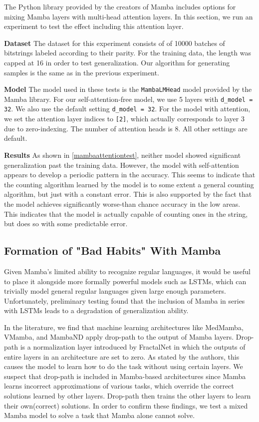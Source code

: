 The Python library provided by the creators of Mamba\cite{mamba} includes
options for mixing Mamba layers with multi-head attention layers.
In this section, we run an experiment to test the effect including this
attention layer.

\textbf{Dataset}
The dataset for this experiment consists of of 10000 batches of bitstrings
labeled according to their parity.
For the training data, the length was capped at 16 in order to test
generalization.
Our algorithm for generating samples is the same as in the previous experiment.

\textbf{Model}
The model used in these tests is the \verb|MambaLMHead| model provided by the
Mamba library.
For our self-attention-free model, we use 5 layers with \verb|d_model = 32|.
We also use the default setting \verb|d_model = 32|.
For the model with attention, we set the attention layer indices to \verb|[2]|,
which actually corresponds to layer 3 due to zero-indexing.
The number of attention heads is 8.
All other settings are default.

\textbf{Results}
As shown in \ref{mambaattentiontest}, neither model showed significant
generalization past the training data.
However, the model with self-attention appears to develop a periodic pattern in
the accuracy.
This seems to indicate that the counting algorithm learned by the model is to
some extent a general counting algorithm, but just with a constant error.
This is also supported by the fact that the model achieves significantly
worse-than chance accuracy in the low areas.
This indicates that the model is actually capable of counting ones in the
string, but does so with some predictable error.

\subsection{Formation of "Bad Habits" With Mamba}
Given Mamba's limited ability to recognize regular languages, it would be useful
to place it alongside more formally powerful models such as LSTMs, which can
trivially model general regular languages given large enough
parameters\cite{lstmformal}. Unfortunately, preliminary testing found that the
inclusion of Mamba in series with LSTMs leads to a degradation of generalization
ability.

In the literature, we find that machine learning architectures like
MedMamba\cite{medmamba}, VMamba\cite{vmamba}, and MambaND\cite{mamband} apply
drop-path to the output of Mamba layers.
Drop-path is a normalization layer introduced by FractalNet\cite{fractalnet} in
which the outputs of entire layers in an architecture are set to zero.
As stated by the authors, this causes the model to learn how to do the task
without using certain layers.
We suspect that drop-path is included in Mamba-based architectures since Mamba
learns incorrect approximations of various tasks, which override the correct
solutions learned by other layers.
Drop-path then trains the other layers to learn their own(correct) solutions.
In order to confirm these findings, we test a mixed Mamba model to solve a task
that Mamba alone cannot solve.

